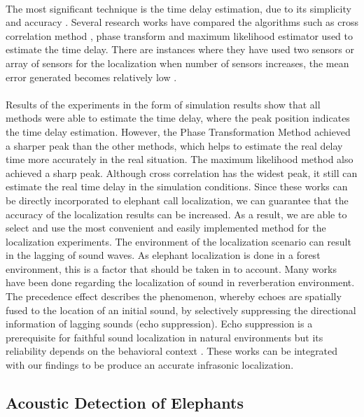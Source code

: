 \documentclass[12pt]{article}
\numberwithin{figure}{section}
\numberwithin{table}{section}
\begin{document}
\paragraph{}
The most significant technique is the time delay estimation, due to its simplicity and accuracy \cite {22}. Several research works have compared the algorithms such as cross correlation method \cite {23}, phase transform \cite {24} and maximum likelihood estimator \cite {25} used to estimate the time delay. There are instances where they have used two sensors or array of sensors for the localization when number of sensors increases, the mean error generated becomes relatively low \cite {26}.

\paragraph{}
Results of the experiments in the form of simulation results \cite {26} show that all methods were able to estimate the time delay, where the peak position indicates the time delay estimation. However, the Phase Transformation Method  achieved a sharper peak than the other methods, which helps to estimate the real delay time more accurately in the real situation. The maximum likelihood method also achieved a sharp peak. Although cross correlation has the widest peak, it still can estimate the real time delay in the simulation conditions. Since these works can be directly incorporated to elephant call localization, we can guarantee that the accuracy of the localization results can be increased. As a result, we are able to select and use the most convenient and easily implemented method for the localization experiments. The environment of the localization scenario can result in the lagging of sound waves. As elephant localization is done in a forest environment, this is a factor that should be taken in to account. Many works have been done regarding the localization of sound in reverberation environment. The precedence effect describes the phenomenon, whereby echoes are spatially fused to the location of an initial sound, by selectively suppressing the directional information of lagging sounds (echo suppression). Echo suppression is a prerequisite for faithful sound localization in natural environments but its reliability depends on the behavioral context \cite {27}. These works can be integrated with our findings to be produce an accurate infrasonic localization. 

\subsection{Acoustic Detection of Elephants}
\end{document}
